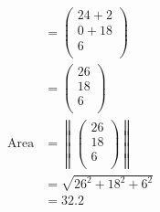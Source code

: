 \documentclass[12pt]{article}
\begin{document}
\begin{align*}
&=
\left( \begin{array}{c}
	24 + 2\\
	0 + 18\\
	6\\
\end{array} \right)\\
&=
\left( \begin{array}{c}
	26\\
	18\\
	6\\
\end{array} \right)\\
\text{Area} &= 
\left\lVert
\left( \begin{array}{c}
	26\\
	18\\
	6\\
\end{array} \right)
\right\rVert \\
&= \sqrt{26^2 + 18^2 + 6^2} \\
&= 32.2 
\end{align*}
\filbreak
\end{document}
